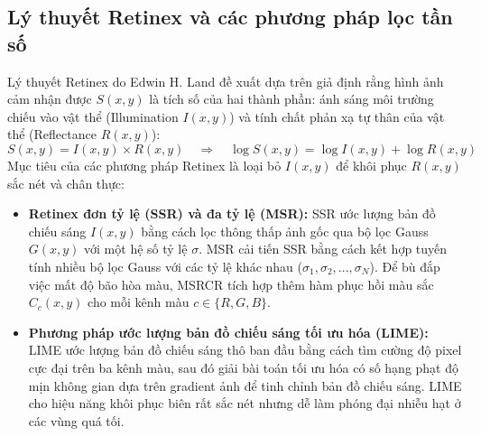 \documentclass[a4paper]{article}
\begin{document}
\subsection{Lý thuyết Retinex và các phương pháp lọc tần số}
Lý thuyết Retinex do Edwin H. Land đề xuất dựa trên giả định rằng hình ảnh cảm nhận được $S(x, y)$ là tích số của hai thành phần: ánh sáng môi trường chiếu vào vật thể (Illumination $I(x, y)$) và tính chất phản xạ tự thân của vật thể (Reflectance $R(x, y)$):
\begin{equation}
    S(x, y) = I(x, y) \times R(x, y) \quad \Longrightarrow \quad \log S(x, y) = \log I(x, y) + \log R(x, y)
\end{equation}
Mục tiêu của các phương pháp Retinex là loại bỏ $I(x, y)$ để khôi phục $R(x, y)$ sắc nét và chân thực:
\begin{itemize}
    \item \textbf{Retinex đơn tỷ lệ (SSR) và đa tỷ lệ (MSR):} SSR ước lượng bản đồ chiếu sáng $I(x, y)$ bằng cách lọc thông thấp ảnh gốc qua bộ lọc Gauss $G(x, y)$ với một hệ số tỷ lệ $\sigma$. MSR cải tiến SSR bằng cách kết hợp tuyến tính nhiều bộ lọc Gauss với các tỷ lệ khác nhau ($\sigma_1, \sigma_2, ..., \sigma_N$). Để bù đắp việc mất độ bão hòa màu, MSRCR tích hợp thêm hàm phục hồi màu sắc $C_c(x, y)$ cho mỗi kênh màu $c \in \{R, G, B\}$.
    \item \textbf{Phương pháp ước lượng bản đồ chiếu sáng tối ưu hóa (LIME):} LIME ước lượng bản đồ chiếu sáng thô ban đầu bằng cách tìm cường độ pixel cực đại trên ba kênh màu, sau đó giải bài toán tối ưu hóa có số hạng phạt độ mịn không gian dựa trên gradient ảnh để tinh chỉnh bản đồ chiếu sáng. LIME cho hiệu năng khôi phục biên rất sắc nét nhưng dễ làm phóng đại nhiễu hạt ở các vùng quá tối.
\end{itemize}
\end{document}
